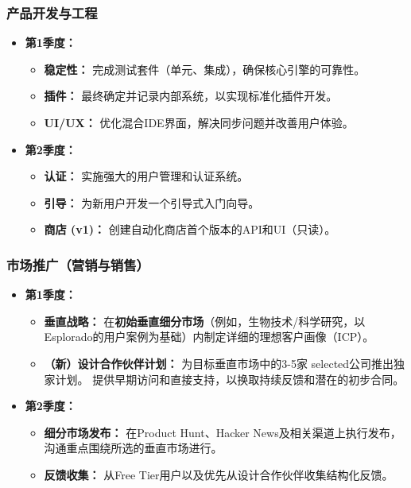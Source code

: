 \documentclass[11pt, a4paper, oneside]{article}
\begin{document}
\subsubsection*{产品开发与工程}
\begin{itemize}[leftmargin=*]
    \item \textbf{第1季度：}
    \begin{itemize}
        \item \textbf{稳定性：} 完成测试套件（单元、集成），确保核心引擎的可靠性。
        \item \textbf{插件：} 最终确定并记录内部系统，以实现标准化插件开发。
        \item \textbf{UI/UX：} 优化混合IDE界面，解决同步问题并改善用户体验。
    \end{itemize}
    \item \textbf{第2季度：}
    \begin{itemize}
        \item \textbf{认证：} 实施强大的用户管理和认证系统。
        \item \textbf{引导：} 为新用户开发一个引导式入门向导。
        \item \textbf{商店 (v1)：} 创建自动化商店首个版本的API和UI（只读）。
    \end{itemize}
\end{itemize}

\subsubsection*{市场推广（营销与销售）}
\begin{itemize}[leftmargin=*]
    \item \textbf{第1季度：}
    \begin{itemize}
        \item \textbf{垂直战略：} 在\textbf{初始垂直细分市场}（例如，生物技术/科学研究，以Esplorado的用户案例为基础）内制定详细的理想客户画像（ICP）。
        \item \textbf{（新）设计合作伙伴计划：} 为目标垂直市场中的3-5家 selected公司推出独家计划。 提供早期访问和直接支持，以换取持续反馈和潜在的初步合同。
    \end{itemize}
    \item \textbf{第2季度：}
    \begin{itemize}
        \item \textbf{细分市场发布：} 在Product Hunt、Hacker News及相关渠道上执行发布，沟通重点围绕所选的垂直市场进行。
        \item \textbf{反馈收集：} 从Free Tier用户以及优先从设计合作伙伴收集结构化反馈。
    \end{itemize}
\end{itemize}
\end{document}
